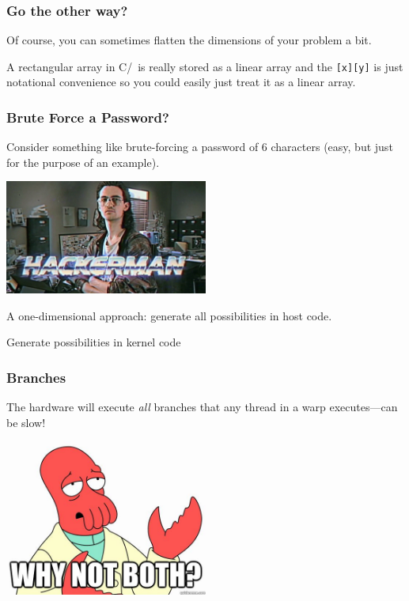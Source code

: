 \begin{frame}
\frametitle{Go the other way?}

Of course, you can sometimes flatten the dimensions of your problem a bit. 

A rectangular array in C/\CPP~is really stored as a linear array and the \texttt{[x][y]} is just notational convenience so you could easily just treat it as a linear array.

\end{frame}


\begin{frame}
\frametitle{Brute Force a Password?}

Consider something like brute-forcing a password of 6 characters (easy, but just for the purpose of an example).

\begin{center}
	\includegraphics[width=0.5\textwidth]{images/hackerman2.png}
\end{center}

A one-dimensional approach: generate all possibilities in host code.

Generate possibilities in kernel code


\end{frame}



\begin{frame}
\frametitle{Branches}

The hardware will execute \emph{all} branches that any thread in a warp
      executes---can be slow!\\[1em]


\begin{center}
	\includegraphics[width=0.5\textwidth]{images/whynotboth.jpg}
\end{center}

\end{frame}


